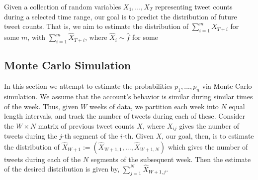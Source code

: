 \documentclass{article}
\begin{document}
Given a collection of random variables $X_1,...,X_T$ representing tweet counts during a selected time range, our goal is to predict the distribution
of future tweet counts. That is, we aim to estimate the distribution
of $\sum_{i=1}^m X_{T + i}$ for some $m$, with $\sum_{i=1}^m \hat{X}_{T + i}$, where $\hat{X}_i \sim \hat{f}$ for some 


\subsection{Monte Carlo Simulation}
In this section we attempt to estimate the probabilities $p_1,...,p_n$ via Monte Carlo simulation.
We assume that the account's behavior is similar during similar times of the week. Thus, given $W$ weeks of data,
we partition each week into $N$ equal length intervals,
and track the number of tweets during each of these.
Consider the $W \times N$ matrix of previous tweet counts
$X$, where $X_{ij}$ gives the number of tweets during the $j$-th segment of the $i$-th. Given $X$, our goal, then,
is to estimate the distribution of $\hat{X}_{W+1} :=  (\hat{X}_{W+1,1},...,\hat{X}_{W+1,N})$ which gives the number of tweets during each of the $N$ segments
of the subsequent week. Then the estimate of the desired distribution is given by, $\sum_{j=1}^N \hat{X}_{W+1, j}$. 

 

\end{document}

